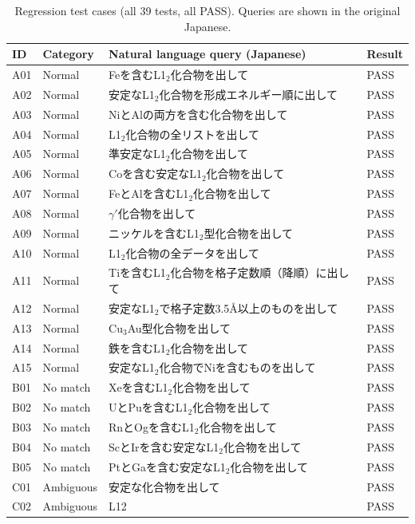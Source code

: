 \begin{table}[htbp]
\centering
\caption{Regression test cases (all 39 tests, all PASS). Queries are shown in the original Japanese.}
\label{tab:sup_all_tests}
\footnotesize
\begin{tabular}{llp{8cm}l}
  \toprule
  ID & Category & Natural language query (Japanese) & Result \\
  \midrule
  A01 & Normal & Feを含むL1$_2$化合物を出して & PASS \\
  A02 & Normal & 安定なL1$_2$化合物を形成エネルギー順に出して & PASS \\
  A03 & Normal & NiとAlの両方を含む化合物を出して & PASS \\
  A04 & Normal & L1$_2$化合物の全リストを出して & PASS \\
  A05 & Normal & 準安定なL1$_2$化合物を出して & PASS \\
  A06 & Normal & Coを含む安定なL1$_2$化合物を出して & PASS \\
  A07 & Normal & FeとAlを含むL1$_2$化合物を出して & PASS \\
  A08 & Normal & $\gamma'$化合物を出して & PASS \\
  A09 & Normal & ニッケルを含むL1$_2$型化合物を出して & PASS \\
  A10 & Normal & L1$_2$化合物の全データを出して & PASS \\
  A11 & Normal & Tiを含むL1$_2$化合物を格子定数順（降順）に出して & PASS \\
  A12 & Normal & 安定なL1$_2$で格子定数3.5\AA 以上のものを出して & PASS \\
  A13 & Normal & Cu$_3$Au型化合物を出して & PASS \\
  A14 & Normal & 鉄を含むL1$_2$化合物を出して & PASS \\
  A15 & Normal & 安定なL1$_2$化合物でNiを含むものを出して & PASS \\
  \midrule
  B01 & No match & Xeを含むL1$_2$化合物を出して & PASS \\
  B02 & No match & UとPuを含むL1$_2$化合物を出して & PASS \\
  B03 & No match & RnとOgを含むL1$_2$化合物を出して & PASS \\
  B04 & No match & ScとIrを含む安定なL1$_2$化合物を出して & PASS \\
  B05 & No match & PtとGaを含む安定なL1$_2$化合物を出して & PASS \\
  \midrule
  C01 & Ambiguous & 安定な化合物を出して & PASS \\
  C02 & Ambiguous & L12 & PASS \\

\end{tabular}
\end{table}
